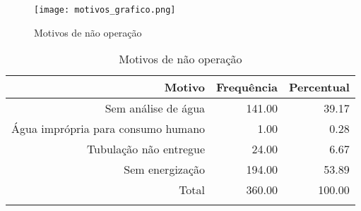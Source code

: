 \documentclass[a4paper, 12pt, openright, oneside, english, brazil, article]{abntex2}
\begin{document}
	
	
	\begin{figure}[!h]
		\centering
		\caption{Motivos de não operação}
		\label{motivos-grafico}
		\texttt{[image: motivos\_grafico.png]}
	\end{figure}
	
	
	\begin{scriptsize}
		\begin{longtable}{rrr}
			\caption{Motivos de não operação} \\ 
			\hline
			Motivo & Frequência & Percentual \\ 
			\hline
			Sem análise de água & 141.00 & 39.17 \\
			Água imprópria para consumo humano & 1.00 & 0.28 \\  
			Tubulação não entregue & 24.00 & 6.67 \\
			Sem energização& 194.00 & 53.89 \\
			\hline
			Total & 360.00 & 100.00 \\ 
			\hline
			\hline
			\label{mot-nao-operacao}
		\end{longtable}
	\end{scriptsize}
	
	
	
	
\end{document}
